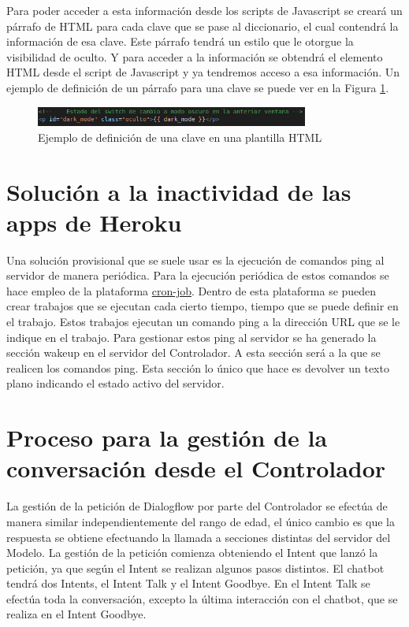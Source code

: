 Para poder acceder a esta información desde los scripts de Javascript se creará un párrafo de HTML para cada clave que se pase al diccionario, el cual contendrá la información de esa clave. Este párrafo tendrá un estilo que le otorgue la visibilidad de oculto. Y para acceder a la información se obtendrá el elemento HTML desde el script de Javascript y ya tendremos acceso a esa información. Un ejemplo de definición de un párrafo para una clave se puede ver en la Figura \ref{fig:def_clave_jinja}.

\begin{figure}[h]
\centering
\includegraphics[width=0.8\textwidth]{imagenes/07_Implementacion/def_clave_jinja.png}
\caption{Ejemplo de definición de una clave en una plantilla HTML}
\label{fig:def_clave_jinja}
\end{figure}


\section{Solución a la inactividad de las apps de Heroku} \label{sec:inactividad_Heroku}

Una solución provisional que se suele usar es la ejecución de comandos ping al servidor de manera periódica. Para la ejecución periódica de estos comandos se hace empleo de la plataforma \href{https://console.cron-job.org/}{cron-job}. Dentro de esta plataforma se pueden crear trabajos que se ejecutan cada cierto tiempo, tiempo que se puede definir en el trabajo. Estos trabajos ejecutan un comando ping a la dirección URL que se le indique en el trabajo. Para gestionar estos ping al servidor se ha generado la sección wakeup en el servidor del Controlador. A esta sección será a la que se realicen los comandos ping. Esta sección lo único que hace es devolver un texto plano indicando el estado activo del servidor.

\section{Proceso para la gestión de la conversación desde el Controlador} \label{sec:proce_gestion_conver}

La gestión de la petición de Dialogflow por parte del Controlador se efectúa de manera similar independientemente del rango de edad, el único cambio es que la respuesta se obtiene efectuando la llamada a secciones distintas del servidor del Modelo. La gestión de la petición comienza obteniendo el Intent que lanzó la petición, ya que según el Intent se realizan algunos pasos distintos. El chatbot tendrá dos Intents, el Intent Talk y el Intent Goodbye. En el Intent Talk se efectúa toda la conversación, excepto la última interacción con el chatbot, que se realiza en el Intent Goodbye.

